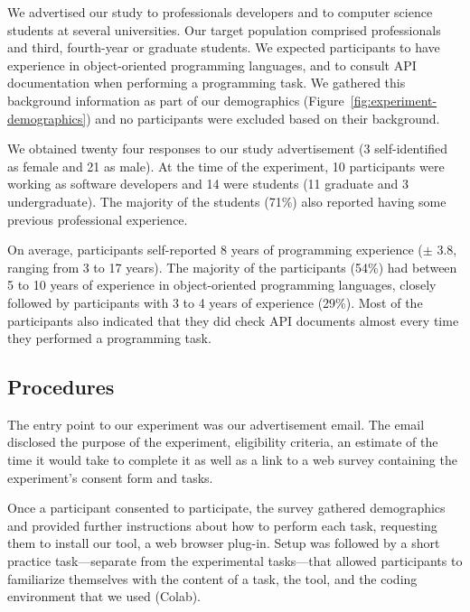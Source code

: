 We advertised our study to professionals developers and to computer science students at  several universities. 
Our target population comprised professionals and third, fourth-year or graduate students.
We expected participants to have experience in object-oriented programming languages, and to consult API documentation when performing a programming task.
We gathered this background information as part of our demographics (Figure~\ref{fig:experiment-demographics})
and no participants were excluded
based on their background.






We obtained twenty four responses to our study advertisement (3 self-identified as female and 21 as male). 
At the time of the experiment, 10 participants were working as software
developers and 14 were students (11 graduate and 3 undergraduate).
The majority of the students (71\%) also reported having some previous professional experience.


On average, participants self-reported 8 years of programming experience ({\small $\pm$} 3.8, ranging from 3 to 17 years).
The majority of the participants (54\%) had between 5 to 10 years of experience in object-oriented programming languages,
closely followed by participants  with  3 to 4 years of experience (29\%). 
Most of the participants also indicated that they did check API documents almost every time they performed a programming task. 








\subsection{Procedures}
\label{cp6:procedures}




The entry point to our experiment was our advertisement email.
The email disclosed the purpose of the experiment, eligibility criteria, an estimate of the time it would take to complete it as well as a link 
to a web survey containing the experiment's consent form and tasks. 


Once a participant consented to participate, the survey gathered demographics and provided further instructions 
about how to perform each task, requesting them to install our tool, a web browser plug-in.
Setup was followed by a short practice task---separate from the experimental tasks---that allowed participants to familiarize themselves with the content of a task, the tool, and the coding environment that we used (Colab). 


